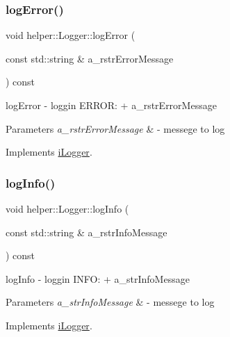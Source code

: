 \subsubsection{\texorpdfstring{logError()}{logError()}}
{\footnotesize\ttfamily void helper\+::\+Logger\+::log\+Error (\begin{DoxyParamCaption}\item[{const std\+::string \&}]{a\+\_\+rstr\+Error\+Message }\end{DoxyParamCaption}) const\hspace{0.3cm}{\ttfamily [virtual]}}



log\+Error -\/ loggin E\+R\+R\+OR\+: + a\+\_\+rstr\+Error\+Message 


\begin{DoxyParams}{Parameters}
{\em a\+\_\+rstr\+Error\+Message} & -\/ messege to log \\
\hline
\end{DoxyParams}


Implements \mbox{\hyperlink{classi_logger}{i\+Logger}}.

\mbox{\label{classhelper_1_1_logger_aa72f37ba4e8e56c1036e3ab70acc19c6}} 
\subsubsection{\texorpdfstring{logInfo()}{logInfo()}}
{\footnotesize\ttfamily void helper\+::\+Logger\+::log\+Info (\begin{DoxyParamCaption}\item[{const std\+::string \&}]{a\+\_\+rstr\+Info\+Message }\end{DoxyParamCaption}) const\hspace{0.3cm}{\ttfamily [virtual]}}



log\+Info -\/ loggin I\+N\+FO\+: + a\+\_\+str\+Info\+Message 


\begin{DoxyParams}{Parameters}
{\em a\+\_\+str\+Info\+Message} & -\/ messege to log \\
\hline
\end{DoxyParams}


Implements \mbox{\hyperlink{classi_logger}{i\+Logger}}.

\mbox{\label{classhelper_1_1_logger_ad857ce17cf393ea70cdb824e322c90c0}} 
